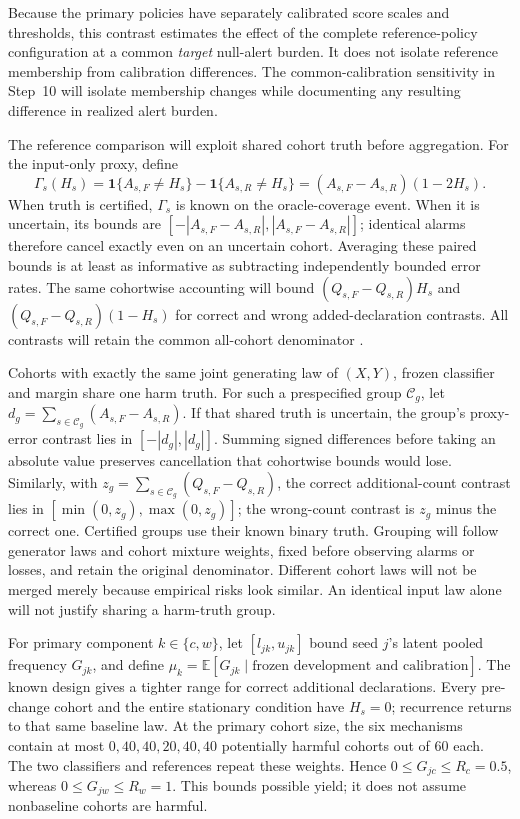 \documentclass[11pt,a4paper]{article}
\newcommand{\ind}{\mathbf{1}}
\begin{document}
Because the primary policies have separately calibrated score scales and
thresholds, this contrast estimates the effect of the complete reference-policy
configuration at a common \emph{target} null-alert burden. It does not isolate
reference membership from calibration differences. The common-calibration
sensitivity in Step~10 will isolate membership changes while documenting any
resulting difference in realized alert burden.

The reference comparison will exploit shared cohort truth before aggregation.
For the input-only proxy, define
\begin{equation}
\Gamma_s(H_s)=\ind\{A_{s,F}\ne H_s\}-\ind\{A_{s,R}\ne H_s\}
=(A_{s,F}-A_{s,R})(1-2H_s).
\end{equation}
When truth is certified, $\Gamma_s$ is known on the oracle-coverage event. When it
is uncertain, its bounds are
$[-|A_{s,F}-A_{s,R}|,|A_{s,F}-A_{s,R}|]$; identical alarms therefore cancel
exactly even on an uncertain cohort. Averaging these paired bounds is at least
as informative as subtracting independently bounded error rates. The same
cohortwise accounting will bound $(Q_{s,F}-Q_{s,R})H_s$ and
$(Q_{s,F}-Q_{s,R})(1-H_s)$ for correct and wrong added-declaration contrasts.
All contrasts will retain the common all-cohort denominator
\cite{hoeffding,window}.

Cohorts with exactly the same joint generating law of $(X,Y)$, frozen classifier and
margin share one harm truth. For such a prespecified group $\mathcal C_g$,
let $d_g=\sum_{s\in\mathcal C_g}(A_{s,F}-A_{s,R})$. If that shared truth is
uncertain, the group's proxy-error contrast lies in $[-|d_g|,|d_g|]$.
Summing signed differences before taking an absolute value preserves
cancellation that cohortwise bounds would lose. Similarly, with
$z_g=\sum_{s\in\mathcal C_g}(Q_{s,F}-Q_{s,R})$, the correct additional-count
contrast lies in $[\min(0,z_g),\max(0,z_g)]$; the wrong-count contrast is
$z_g$ minus the correct one. Certified groups use their known binary truth.
Grouping will follow generator laws and cohort mixture weights, fixed before
observing alarms or losses, and retain the original denominator. Different
cohort laws will not be merged merely because empirical risks look similar.
An identical input law alone will not justify sharing a harm-truth group.

For primary component $k\in\{c,w\}$, let $[l_{jk},u_{jk}]$ bound seed $j$'s
latent pooled frequency $G_{jk}$, and define
$\mu_k=\mathbb E[G_{jk}\mid\text{frozen development and calibration}]$.
The known design gives a tighter range for correct additional declarations.
Every pre-change cohort and the entire stationary condition have $H_s=0$;
recurrence returns to that same baseline law. At the primary cohort size,
the six mechanisms contain at most $0,40,40,20,40,40$ potentially harmful
cohorts out of 60 each. The two classifiers and references repeat these weights.
Hence $0\leq G_{jc}\leq R_c=0.5$, whereas $0\leq G_{jw}\leq R_w=1$.
This bounds possible yield; it does not assume nonbaseline cohorts are harmful.
\end{document}
